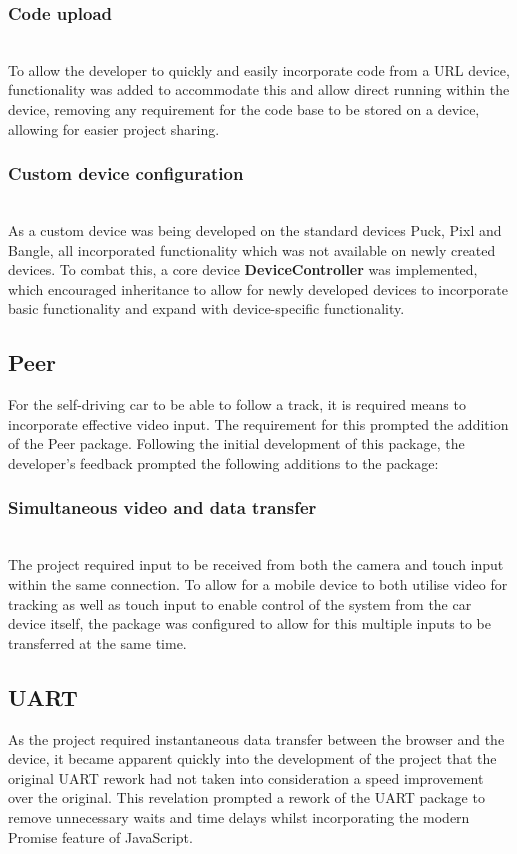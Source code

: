 \documentclass{l4proj}
\begin{document}
\subsubsection{Code upload}\hfill\\
To allow the developer to quickly and easily incorporate code from a URL device, functionality was added to accommodate this and allow direct running within the device, removing any requirement for the code base to be stored on a device, allowing for easier project sharing.
\subsubsection{Custom device configuration}\hfill\\
As a custom device was being developed on the standard devices Puck, Pixl and Bangle, all incorporated functionality which was not available on newly created devices. To combat this, a core device \textbf{DeviceController} was implemented, which encouraged inheritance to allow for newly developed devices to incorporate basic functionality and expand with device-specific functionality.
\subsection{Peer}
For the self-driving car to be able to follow a track, it is required means to incorporate effective video input. The requirement for this prompted the addition of the Peer package. Following the initial development of this package, the developer's feedback prompted the following additions to the package:

\subsubsection{Simultaneous video and data transfer}\hfill\\
The project required input to be received from both the camera and touch input within the same connection. To allow for a mobile device to both utilise video for tracking as well as touch input to enable control of the system from the car device itself, the package was configured to allow for this multiple inputs to be transferred at the same time.
\subsection{UART}
As the project required instantaneous data transfer between the browser and the device, it became apparent quickly into the development of the project that the original UART rework had not taken into consideration a speed improvement over the original. This revelation prompted a rework of the UART package to remove unnecessary waits and time delays whilst incorporating the modern Promise feature of JavaScript.
\end{document}
